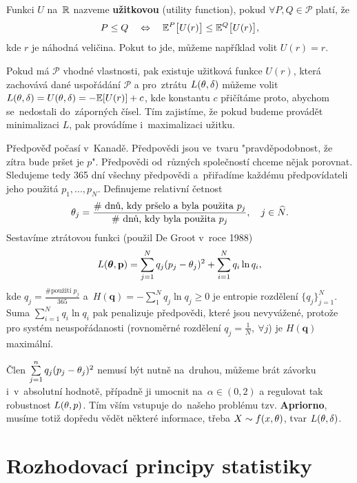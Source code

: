 \begin{define}
	Funkci $U$ na~$\mathbb{R}$ nazveme \textbf{užitkovou} (utility function), pokud $\forall P,Q\in\mathcal{P}$ platí, že 
	$$ P\leq Q\quad\Leftrightarrow\quad\mathbb{E}^P\big[U(r)\big]\leq\mathbb{E}^Q\big[U(r)\big],$$ kde $r$ je náhodná veličina. Pokut to jde, můžeme například volit $U(r)=r$.
\end{define}
\begin{remark}
	Pokud má $\mathcal{P}$ vhodné vlastnosti, pak existuje užitková funkce $U(r)$, která zachovává dané uspořádání $\mathcal{P}$ a pro~ztrátu $L(\theta,\delta)$ můžeme volit $L(\theta,\delta)=U(\theta,\delta)=-\mathbb{E}[U(r)]+c$, kde konstantu $c$ přičítáme proto, abychom se~nedostali do~záporných čísel. Tím zajistíme, že pokud budeme provádět minimalizaci $L$, pak provádíme i~maximalizaci užitku.
\end{remark}
\begin{example}[volba L]
		Předpověď počasí v~Kanadě. Předpovědi jsou ve~tvaru "pravděpodobnost, že zítra bude pršet je $p$". Předpovědi od~různých společností chceme nějak porovnat. Sledujeme tedy 365 dní všechny předpovědi a~přiřadíme každému předpovídateli jeho použitá $p_1,...,p_N$. Definujeme relativní četnost $$\theta_j=\frac{\text{\# dnů, kdy pršelo a~byla použita }p_j}{\text{\# dnů, kdy byla použita }p_j},\quad j\in\widehat{N}.$$ Sestavíme ztrátovou funkci (použil De Groot v~roce 1988) $$L(\boldsymbol{\theta},\textbf{p})=\sum_{j=1}^N q_j(p_j-\theta_j)^2+\sum_{i=1}^N q_i\ln q_i,$$ kde $q_j=\frac{\text{\# použití }p_j}{365}$ a~$H(\textbf{q})=-\sum_1^N q_j\ln q_j\geq 0$ je entropie rozdělení $\{q_j\}_{j=1}^N$. Suma $\sum_{i=1}^N q_i\ln q_i$ pak penalizuje předpovědi, které jsou nevyvážené, protože pro systém neuspořádanosti (rovnoměrné rozdělení $q_j=\frac{1}{N},~\forall j$) je $H(\textbf{q})$ maximální.
		
		Člen $\sum\limits_{j=1}^{n} q_j(p_j-\theta_j)^2$ nemusí být nutně na~druhou, můžeme brát závorku i~v~absolutní hodnotě, případně ji umocnit na~$\alpha\in(0,2)$ a regulovat tak robustnost $L(\theta,p)$. Tím vším vstupuje do~našeho problému tzv. \textbf{Apriorno}, musíme totiž dopředu vědět některé informace, třeba $X\sim f(x,\theta)$, tvar $L(\theta,\delta)$. 
\end{example}

\section{Rozhodovací principy statistiky}

